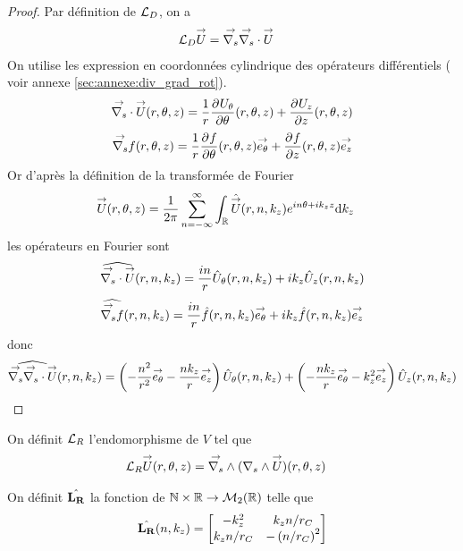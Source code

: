     \begin{proof}
      Par définition de \(\LD\), on a
      \begin{align*}
        \LD \vect{U} & = \vgrads{} \vdivs{} \vect{U}
      \end{align*}
      On utilise les expression en coordonnées cylindrique des opérateurs différentiels ( voir annexe \ref{sec:annexe:div_grad_rot}).
      \begin{align*}
        \vdivs{\vect{U}}(r,\theta,z) = \frac{1}{r}\ddr{\theta}{U_\theta}(r,\theta,z) + \ddr{z}{U_z}(r,\theta,z)
      \end{align*}
      \begin{align*}
        \vgrads{f}(r,\theta,z) = \frac{1}{r}\ddr{\theta}{f}(r,\theta,z)\vect{e_\theta} + \ddr{z}{f}(r,\theta,z)\vect{e_z}
      \end{align*}
      Or d’après la définition de la transformée de Fourier
      \begin{align*}
        \vect{U}(r,\theta,z) & = \frac{1}{2\pi}\sum_{n=-\infty}^\infty \int_\RR \hat{\vect{U}}(r,n,k_z)e^{in\theta + ik_zz}\dd{k_z}
      \end{align*}
      les opérateurs en Fourier sont
      \begin{align*}
        \widehat{\vdivs{\vect{U}}}(r,n,k_z) = \frac{in}{r}{\hat{U}_\theta}(r,n,k_z) + ik_z{\hat{U}_z}(r,n,k_z)
      \end{align*}
      \begin{align*}
        \widehat{\vgrads{f}}(r,n,k_z) = \frac{in}{r}\hat{f}(r,n,k_z)\vect{e_\theta} + ik_z\hat{f}(r,n,k_z)\vect{e_z}
      \end{align*}
      donc
      \begin{align*}
        \widehat{\vgrads \vdivs{\vect{U}}}(r,n,k_z) =  \left(-\frac{n^2}{r^2}\vect{e_\theta} - \frac{nk_z}{r}\vect{e_z}\right){\hat{U}_\theta}(r,n,k_z) + \left(-\frac{nk_z}{r}\vect{e_\theta} - {k_z^2}\vect{e_z}\right){\hat{U}_z}(r,n,k_z)
      \end{align*}

    \end{proof}


    \begin{defn}
      \label{eq:cylindre:fourier:LR}

      On définit \(\LR\) l'endomorphisme de \(V\) tel que
      \begin{align*}
        \LR \vect{U}(r,\theta,z) & = \vrots{} (\rots{} \vect{U})(r,\theta,z)
      \end{align*}

      On définit \(\hat{\mLR}\) la fonction de \(\NN\times\RR \rightarrow \mathcal{M}_2(\RR)\) telle que
      \begin{equation*}
        \hat{\mLR}(n,k_z) = 
        \begin{bmatrix}
          -k_z^2 & k_z{n}\slash{r_C}
          \\
          k_z{n}\slash{r_C} & -\left({n}\slash{r_C}\right)^2
        \end{bmatrix}
      \end{equation*}
    \end{defn}

